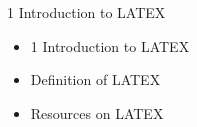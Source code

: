 \documentclass{beamer}
\begin{document}
  \begin{frame}{1 Introduction to LATEX}
	\begin{itemize}
		\item 1 Introduction to LATEX
		\item Definition of LATEX
		\item Resources on LATEX
	\end{itemize}
\end{frame}
\end{document}

